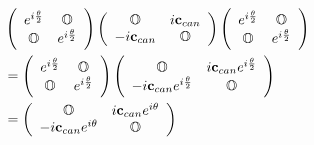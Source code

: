 \documentclass[aps,preprint]{revtex4}%
\begin{document}
\begin{align*}
&  \left(
\begin{array}
[c]{cc}%
e^{i\frac{\mathbf{\theta}}{2}} & \mathbb{O}\\
\mathbb{O} & e^{i\frac{\mathbf{\theta}}{2}}%
\end{array}
\right)  \left(
\begin{array}
[c]{cc}%
\mathbb{O} & i\mathbf{c}_{can}\\
-i\mathbf{c}_{can} & \mathbb{O}%
\end{array}
\right)  \left(
\begin{array}
[c]{cc}%
e^{i\frac{\mathbf{\theta}}{2}} & \mathbb{O}\\
\mathbb{O} & e^{i\frac{\mathbf{\theta}}{2}}%
\end{array}
\right) \\
&  =\left(
\begin{array}
[c]{cc}%
e^{i\frac{\mathbf{\theta}}{2}} & \mathbb{O}\\
\mathbb{O} & e^{i\frac{\mathbf{\theta}}{2}}%
\end{array}
\right)  \left(
\begin{array}
[c]{cc}%
\mathbb{O} & i\mathbf{c}_{can}e^{i\frac{\mathbf{\theta}}{2}}\\
-i\mathbf{c}_{can}e^{i\frac{\mathbf{\theta}}{2}} & \mathbb{O}%
\end{array}
\right) \\
&  =\left(
\begin{array}
[c]{cc}%
\mathbb{O} & i\mathbf{c}_{can}e^{i\mathbf{\theta}}\\
-i\mathbf{c}_{can}e^{i\mathbf{\theta}} & \mathbb{O}%
\end{array}
\right)
\end{align*}%
\end{document}
